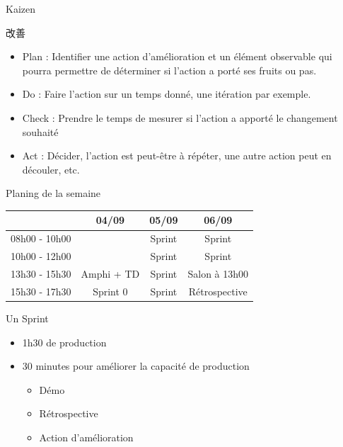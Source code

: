 \documentclass{beamer}
\begin{document}
\begin{frame}{Kaizen 
    {\begin{CJK*}{UTF8}{mj} 改善 \end{CJK*}}
  }
  
  \begin{itemize}
    \item \alert{Plan} : Identifier une action d'amélioration et un élément observable qui pourra permettre de déterminer si l'action a porté ses fruits ou pas.
    \item \alert{Do} : Faire l'action sur un temps donné, une itération par exemple.
    \item \alert{Check} : Prendre le temps de mesurer si l'action a apporté le changement souhaité
    \item \alert{Act} : Décider, l'action est peut-être à répéter, une autre action peut en découler, etc.
  \end{itemize}

\end{frame}


\begin{frame}{Planing de la semaine}{}
  {
    \center
    \begin{tabular}{l | g | g | g  }
      & \textbf{04/09} & \textbf{05/09} & \textbf{06/09} \\
      \hline
      08h00 - 10h00 &          & Sprint & Sprint \\
      \hline
      10h00 - 12h00 &          & Sprint & Sprint \\
      \hline
      13h30 - 15h30 & Amphi + TD & Sprint & Salon à 13h00 \\
      \hline
      15h30 - 17h30 & Sprint 0 & Sprint & Rétrospective \\
      \hline
    \end{tabular}
  }

\end{frame}

\begin{frame}{Un Sprint}
  \begin{itemize}
    \item 1h30 de production
    \item 30 minutes pour améliorer la capacité de production
    \begin{itemize}
      \item Démo 
      \item Rétrospective 
      \item Action d'amélioration
    \end{itemize}
  \end{itemize}
\end{frame}
\end{document}

